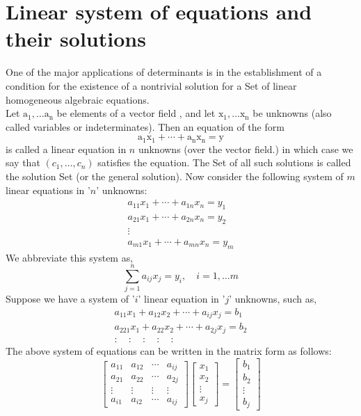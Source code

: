 \section{Linear system of equations and  their solutions}
One of the major applications of determinants is in the establishment of a condition for the existence of a nontrivial solution for a Set of linear homogeneous algebraic equations.\\
Let $\mathrm{a}_{1}, \ldots \mathrm{a}_{\mathrm{n}}$ be elements of a vector  field , and let $\mathrm{x}_{1}, \ldots \mathrm{x}_{\mathrm{n}}$ be unknowns
(also called variables or indeterminates). Then an equation of the form
$$
\mathrm{a}_{1} \mathrm{x}_{1}+\cdots+\mathrm{a}_{\mathrm{n}} \mathrm{x}_{\mathrm{n}}=\mathrm{y}
$$
is called a linear equation in $n$ unknowns (over the vector field.)
in which case we say that $\left(c_{1}, \ldots, c_{n}\right)$ satisfies the equation. The Set of all such solutions is called the solution Set (or the general solution).
Now consider the following system of ${m}$ linear equations in '${n}$' unknowns:
$$
\begin{array}{c}
	a_{11} x_{1}+\cdots+a_{1 n} x_{n}=y_{1} \\
	a_{21} x_{1}+\cdots+a_{2 n} x_{n}=y_{2} \\
	\vdots \\
	a_{m 1} x_{1}+\cdots+a_{m n} x_{n}=y_{m}
\end{array}
$$
We abbreviate this system as,
$$
\sum_{j=1}^{n} a_{i j} x_{j}=y_{i}, \quad i=1, \ldots m
$$
Suppose we have a system of '$ i $' linear equation in '$ j $' unknowns, such as,
$$
\begin{array}{c}
	a_{11} x_{1}+a_{12} x_{2}+\cdots+a_{i j} x_{j}=b_{1} \\
	a_{221} x_{1}+a_{22} x_{2}+\cdots+a_{2 j} x_{j}=b_{2} \\
	: \quad: \quad: \quad: \quad:
\end{array}
$$
The above system of equations can be written in the matrix form as follows:
$$
\left[\begin{array}{cccc}
	a_{11} & a_{12} & \cdots & a_{i j} \\
	a_{21} & a_{22} & \cdots & a_{2 j} \\
	\vdots & \vdots & \vdots & \vdots \\
	a_{i 1} & a_{i 2} & \cdots & a_{i j}
\end{array}\right]\left[\begin{array}{c}
	x_{1} \\
	x_{2} \\
	\vdots \\
	x_{j}
\end{array}\right]=\left[\begin{array}{c}
	b_{1} \\
	b_{2} \\
	\vdots \\
	b_{j}
\end{array}\right]
$$
